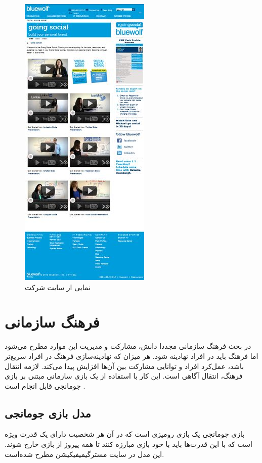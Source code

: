 \begin{figure}[!htb]
	\centering
	\includegraphics[height=0.5\textheight]{Figures/bluewolf.png}
	\caption{نمایی از سایت شرکت }
\end{figure}

\section{فرهنگ سازمانی}
در بحث فرهنگ سازمانی مجددا دانش، مشارکت و مدیریت این موارد مطرح می‌شود اما فرهنگ باید در افراد نهادینه شود. هر میزان که نهادینه‌سازی فرهنگ در افراد سریع‌تر باشد، عمل‌کرد افراد و توانایی مشارکت بین آن‌ها افزایش پیدا می‌کند. لازمه انتقال فرهنگ، انتقال آگاهی است. این کار با استفاده از یک بازی سازمانی مبتنی بر بازی جومانجی قابل انجام است \cite{amiriamin}.
\subsection{مدل بازی جومانجی}
بازی جومانجی یک بازی رومیزی است که در آن هر شخصیت دارای یک قدرت ویژه است  که با این قدرت‌ها باید با خود بازی مبارزه کنند تا همه پیروز از بازی خارج شوند. این مدل در سایت مسترگیمیفیکیشن \cite{mrg} مطرح شده‌است.


